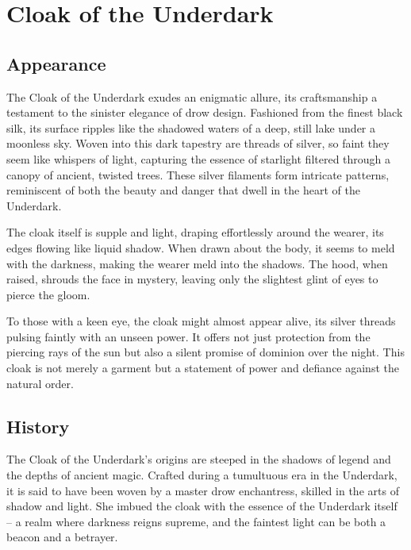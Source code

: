
\chapter*{Cloak of the Underdark}

\section*{Appearance}
The Cloak of the Underdark exudes an enigmatic allure, its craftsmanship a testament to the sinister elegance of drow design. Fashioned from the finest black silk, its surface ripples like the shadowed waters of a deep, still lake under a moonless sky. Woven into this dark tapestry are threads of silver, so faint they seem like whispers of light, capturing the essence of starlight filtered through a canopy of ancient, twisted trees. These silver filaments form intricate patterns, reminiscent of both the beauty and danger that dwell in the heart of the Underdark.

The cloak itself is supple and light, draping effortlessly around the wearer, its edges flowing like liquid shadow. When drawn about the body, it seems to meld with the darkness, making the wearer meld into the shadows. The hood, when raised, shrouds the face in mystery, leaving only the slightest glint of eyes to pierce the gloom.

To those with a keen eye, the cloak might almost appear alive, its silver threads pulsing faintly with an unseen power. It offers not just protection from the piercing rays of the sun but also a silent promise of dominion over the night. This cloak is not merely a garment but a statement of power and defiance against the natural order.

\section*{History}
The Cloak of the Underdark's origins are steeped in the shadows of legend and the depths of ancient magic. Crafted during a tumultuous era in the Underdark, it is said to have been woven by a master drow enchantress, skilled in the arts of shadow and light. She imbued the cloak with the essence of the Underdark itself – a realm where darkness reigns supreme, and the faintest light can be both a beacon and a betrayer.

